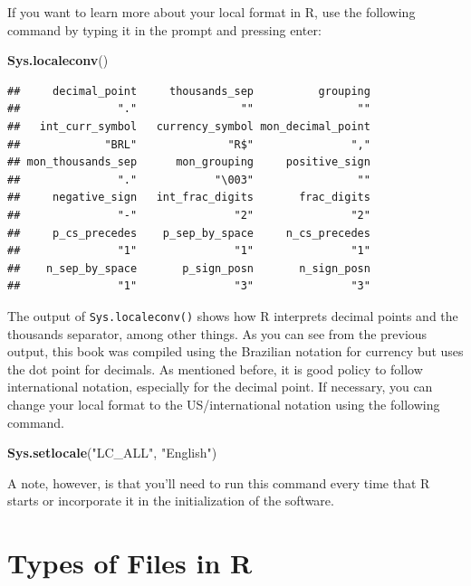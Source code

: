 \documentclass[11pt,]{book}
\newenvironment{Shaded}{\begin{snugshade}}{\end{snugshade}}
\newcommand{\KeywordTok}[1]{\textcolor[rgb]{0.27,0.27,0.27}{\textbf{#1}}}
\newcommand{\StringTok}[1]{\textcolor[rgb]{0.5,0.5,0.5}{#1}}
\newcommand{\NormalTok}[1]{#1}
\begin{document}
If you want to learn more about your local format in R, use the
following command by typing it in the prompt and pressing enter:

\begin{Shaded}
\begin{Highlighting}[]
\KeywordTok{Sys.localeconv}\NormalTok{()}
\end{Highlighting}
\end{Shaded}

\begin{verbatim}
##     decimal_point     thousands_sep          grouping 
##               "."                ""                "" 
##   int_curr_symbol   currency_symbol mon_decimal_point 
##             "BRL"              "R$"               "," 
## mon_thousands_sep      mon_grouping     positive_sign 
##               "."            "\003"                "" 
##     negative_sign   int_frac_digits       frac_digits 
##               "-"               "2"               "2" 
##     p_cs_precedes    p_sep_by_space     n_cs_precedes 
##               "1"               "1"               "1" 
##    n_sep_by_space       p_sign_posn       n_sign_posn 
##               "1"               "3"               "3"
\end{verbatim}

The output of \texttt{Sys.localeconv()} shows how R interprets decimal
points and the thousands separator, among other things. As you can see
from the previous output, this book was compiled using the Brazilian
notation for currency but uses the dot point for decimals. As mentioned
before, it is good policy to follow international notation, especially
for the decimal point. If necessary, you can change your local format to
the US/international notation using the following command.

\begin{Shaded}
\begin{Highlighting}[]
\KeywordTok{Sys.setlocale}\NormalTok{(}\StringTok{"LC_ALL"}\NormalTok{, }\StringTok{"English"}\NormalTok{)}
\end{Highlighting}
\end{Shaded}

A note, however, is that you'll need to run this command every time that
R starts or incorporate it in the initialization of the software.

\section{Types of Files in R}\label{types-of-files-in-r}
\end{document}
